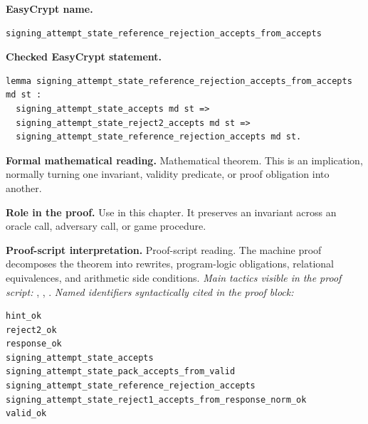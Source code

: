 \begin{formaltheorem}
\noindent\textbf{EasyCrypt name.}
\begin{lstlisting}[language=EasyCrypt,basicstyle=\ttfamily\scriptsize]
signing_attempt_state_reference_rejection_accepts_from_accepts
\end{lstlisting}
\noindent\textbf{Checked EasyCrypt statement.}
\begin{lstlisting}[language=EasyCrypt,basicstyle=\ttfamily\scriptsize]
lemma signing_attempt_state_reference_rejection_accepts_from_accepts md st :
  signing_attempt_state_accepts md st =>
  signing_attempt_state_reject2_accepts md st =>
  signing_attempt_state_reference_rejection_accepts md st.
\end{lstlisting}
\noindent\textbf{Formal mathematical reading.}
Mathematical theorem. This is an implication, normally turning one invariant, validity predicate, or proof obligation into another.

\noindent\textbf{Role in the proof.}
Use in this chapter. It preserves an invariant across an oracle call, adversary call, or game procedure.

\noindent\textbf{Proof-script interpretation.}
Proof-script reading. The machine proof decomposes the theorem into rewrites, program-logic obligations, relational equivalences, and arithmetic side conditions.
\emph{Main tactics visible in the proof script:} , , .
\emph{Named identifiers syntactically cited in the proof block:}
\begin{lstlisting}[language=EasyCrypt,basicstyle=\ttfamily\scriptsize]
hint_ok
reject2_ok
response_ok
signing_attempt_state_accepts
signing_attempt_state_pack_accepts_from_valid
signing_attempt_state_reference_rejection_accepts
signing_attempt_state_reject1_accepts_from_response_norm_ok
valid_ok
\end{lstlisting}

\end{formaltheorem}

